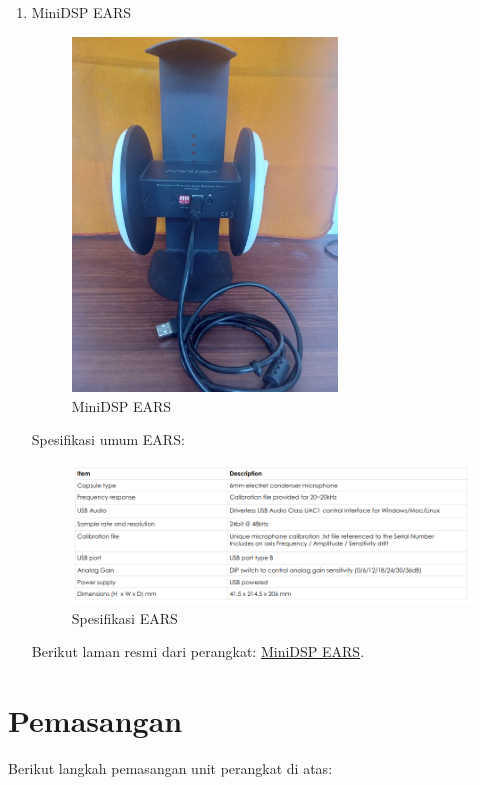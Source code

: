 \documentclass[12pt]{book}
\begin{document}
\begin{enumerate}
        \item MiniDSP EARS
        \begin{figure}[!ht]
			\centering
			\includegraphics[width=200pt,angle=-90]{images/unit/ears}
			\caption{MiniDSP EARS}
		\end{figure}

		Spesifikasi umum EARS:

		\begin{figure}[!ht]
			\centering
			\includegraphics[width=\textwidth]{images/unit/earspec}
			\caption{Spesifikasi EARS}
		\end{figure}

		Berikut laman resmi dari perangkat: \href{https://www.minidsp.com/products/acoustic-measurement/ears-headphone-jig}{MiniDSP EARS}.


     \end{enumerate}

	\newpage
    \section{Pemasangan}

	Berikut langkah pemasangan unit perangkat di atas:
\end{document}
